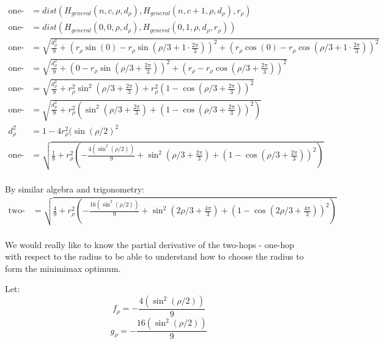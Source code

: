 \documentclass[11pt]{article}
\begin{document}
\begin{align*}
  \text{one-hop} &= dist(H_{general}(n,c,\rho,d_{\rho}),H_{general}(n,c+1,\rho,d_{\rho}),r_{\rho})  \\
  \text{one-hop} &= dist(H_{general}(0,0,\rho,d_{\rho}),H_{general}(0,1,\rho,d_{\rho},r_{\rho}))  \\  
  \text{one-hop}  &= \sqrt{\frac{d_{\rho}^2}{9} + (r_{\rho}\sin(0) - r_{\rho}\sin(\rho/3+1\cdot\frac{2\pi}{3}))^2  +
    (r_{\rho}\cos(0) - r_{\rho}\cos(\rho/3 + 1\cdot\frac{2\pi}{3}))^2} \\
  \text{one-hop}  &= \sqrt{\frac{d_{\rho}^2}{9} + (0  - r_{\rho}\sin(\rho/3 + \frac{2\pi}{3}))^2  +
    (r_{\rho} - r_{\rho}\cos(\rho/3 + \frac{2\pi}{3}))^2} \\
  \text{one-hop}  &= \sqrt{\frac{d_{\rho}^2}{9} + r_{\rho}^2\sin^2(\rho/3 + \frac{2\pi}{3})  +
    r_{\rho}^2(1 - \cos(\rho/3 + \frac{2\pi}{3}))^2} \\
  \text{one-hop}  &= \sqrt{\frac{d_{\rho}^2}{9} + r_{\rho}^2(\sin^2(\rho/3 + \frac{2\pi}{3})  + (1 - \cos(\rho/3 + \frac{2\pi}{3}))^2)} \\
  d_{\rho}^2 &= 1 - 4 r_{\rho}^2 (\sin( \rho / 2)^2 \\
  \text{one-hop}  &= \sqrt{\frac{1}{9}  + r_{\rho}^2(-\frac{4 (\sin^2( \rho / 2))}{9} + \sin^2(\rho/3+ \frac{2\pi}{3})  + (1 - \cos(\rho/3 + \frac{2\pi}{3}))^2)} \\
\end{align*}

By similar algebra and trigonometry:
\begin{align*}
  \text{two-hops}  &= \sqrt{\frac{4}{9} + r_{\rho}^2 (-\frac{16 (\sin^2( \rho / 2))}{9} + \sin^2(2\rho/3 + \frac{4\pi}{3})  + (1 - \cos(2\rho/3 + \frac{4\pi}{3}))^2)} \\
\end{align*}

We would really like to know the partial derivative of the two-hops - one-hop with respect
to the radius to be able to understand how to choose the radius to form the minimimax optimum.

Let:
\begin{equation}
  f_{\rho} = -\frac{4 (\sin^2( \rho / 2))}{9}
  \end{equation}
\begin{equation}
  g_{\rho} = -\frac{16 (\sin^2( \rho / 2))}{9} 
\end{equation}
\end{document}
